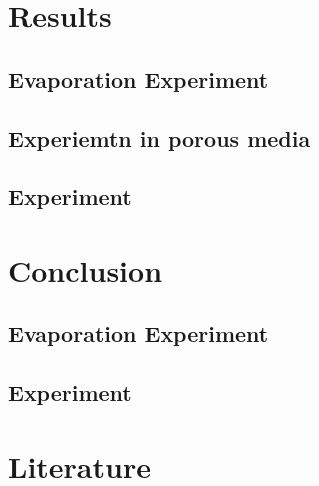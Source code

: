 \documentclass[oneside, a4paper, DIV=11]{scrartcl}
\begin{document}
\section{Results}
\label{sec:res}
\subsection{Evaporation Experiment}
\label{res:eva}
\subsection{\COT Experiemtn in porous media}
\label{res:cpm}
\subsection{\COT Experiment}
\label{res:cot}

\section{Conclusion}
\label{sec:con}
\subsection{Evaporation Experiment}
\label{con:eva}
\subsection{\COT Experiment}
\label{con:cot}

\section{Literature}
\label{sec:lit}
\end{document}
